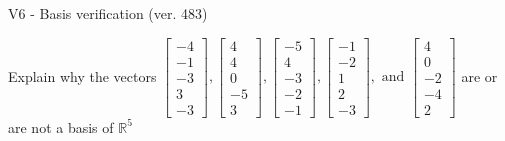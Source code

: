 \begin{exercise}
  \begin{exerciseTitle}V6 - Basis verification (ver. 483)\end{exerciseTitle}
  \begin{exerciseStatement}
    Explain why the vectors \(\left[\begin{array}{r}
-4 \\
-1 \\
-3 \\
3 \\
-3
\end{array}\right] , \left[\begin{array}{r}
4 \\
4 \\
0 \\
-5 \\
3
\end{array}\right] , \left[\begin{array}{r}
-5 \\
4 \\
-3 \\
-2 \\
-1
\end{array}\right] , \left[\begin{array}{r}
-1 \\
-2 \\
1 \\
2 \\
-3
\end{array}\right] , \text{ and } \left[\begin{array}{r}
4 \\
0 \\
-2 \\
-4 \\
2
\end{array}\right]\) are or are not a basis of \(\mathbb{R}^5\)	



\end{exerciseStatement}
\end{exercise}
